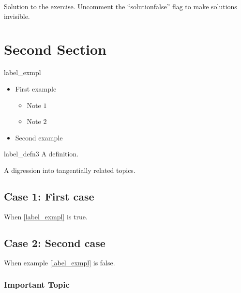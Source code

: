 \documentclass{worksheet}
\begin{document}
    \eoq
    
    \begin{solution}
    Solution to the exercise. Uncomment the ``solutionfalse'' flag to make solutions invisible.
    \end{solution}

    
	\section{Second Section}
	
	
	
	\begin{exmpl}[Title]{label_exmpl}
	 \begin{itemize}
        \item First example 
        \begin{itemize}
            \item  Note $1$
            \item  Note $2$
        \end{itemize}
        \item Second example
    \end{itemize}
	\end{exmpl}
	
	\begin{defn}{label_defn3}
	A definition.
	\end{defn}
	
	\begin{digression}
	    A digression into tangentially related topics.
	\end{digression}
    
    
    
    \subsection{Case 1: First case}
    When  \cref{label_exmpl} is true.
    \begin{warning}[A Warning:] %
     \lipsum[1-1]
    \end{warning}
    
    \subsection{Case 2: Second case}
    When example \ref{label_exmpl} is false.
        
        \subsubsection{Important Topic}
        \lipsum[2-2]
	
\end{document}
